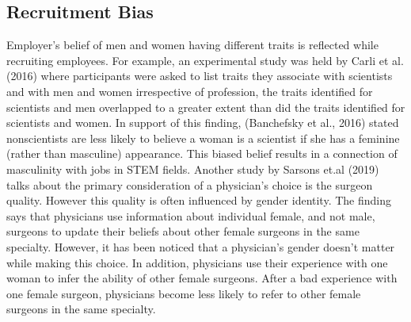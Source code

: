 \documentclass[12pt]{article}
\begin{document}
\subsection{Recruitment Bias}
Employer’s belief of men and women having different traits is reflected while recruiting
employees. For example, an experimental study was held by Carli et al. (2016) where
participants were asked to list traits they associate with scientists and with men and women
irrespective of profession, the traits identified for scientists and men overlapped to a greater
extent than did the traits identified for scientists and women. In support of this finding,
(Banchefsky et al., 2016) stated nonscientists are less likely to believe a woman is a scientist
if she has a feminine (rather than masculine) appearance. This biased belief results in a
connection of masculinity with jobs in STEM fields. Another study by Sarsons et.al (2019)
talks about the primary consideration of a physician's choice is the surgeon quality. However
this quality is often influenced by gender identity. The finding says that physicians use
information about individual female, and not male, surgeons to update their beliefs about
other female surgeons in the same specialty. However, it has been noticed that a physician's
gender doesn't matter while making this choice. In addition, physicians use their experience
with one woman to infer the ability of other female surgeons. After a bad experience with one
female surgeon, physicians become less likely to refer to other female surgeons in the same
specialty.
\end{document}
